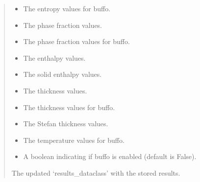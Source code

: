\documentclass[a4paper,11pt,english,openany]{sphinxmanual}
\begin{document}
\begin{fulllineitems}
\begin{fulllineitems}
\begin{quote}
\begin{description}
\begin{itemize}
\item {} 
\sphinxAtStartPar
{} \textendash{} The entropy values for buffo.

\item {} 
\sphinxAtStartPar
{} \textendash{} The phase fraction values.

\item {} 
\sphinxAtStartPar
{} \textendash{} The phase fraction values for buffo.

\item {} 
\sphinxAtStartPar
{} \textendash{} The enthalpy values.

\item {} 
\sphinxAtStartPar
{} \textendash{} The solid enthalpy values.

\item {} 
\sphinxAtStartPar
{} \textendash{} The thickness values.

\item {} 
\sphinxAtStartPar
{} \textendash{} The thickness values for buffo.

\item {} 
\sphinxAtStartPar
{} \textendash{} The Stefan thickness values.

\item {} 
\sphinxAtStartPar
{} \textendash{} The temperature values for buffo.

\item {} 
\sphinxAtStartPar
{} \textendash{} A boolean indicating if buffo is enabled (default is False).

\end{itemize}

\sphinxAtStartPar
The updated ‘results\_dataclass’ with the stored results.

\end{description}\end{quote}

\end{fulllineitems}


\end{fulllineitems}
\end{document}
